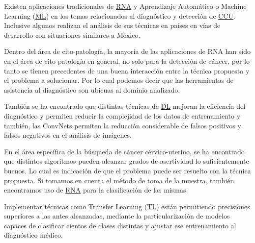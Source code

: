 
Existen aplicaciones tradicionales de \hyperlink{abbr}{RNA} y Aprendizaje
Automático o Machine Learning (\hyperlink{abbr}{ML}) en los temas relacionados al diagnóstico y detección de
\hyperlink{abbr}{CCU}. Inclusive algunos realizan el análisis de sus técnicas en
países en vías de desarrollo con situaciones similares a
México.~\cite{HussainWanandIshakWanandFadzilah1994}

Dentro del área de cito-patología, la mayoría de las aplicaciones de RNA han
sido en el área de cito-patología en general, no solo para la detección de
cáncer, por lo tanto se tienen precedentes de una buena interacción entre la
técnica propuesta y el problema a solucionar. Por lo cual podemos decir que las
herramientas de asistencia al diagnóstico son ubicuas al dominio
analizado.~\cite{Pouliakis2016}

También se ha encontrado que distintas técnicas de \hyperlink{abbr}{DL} mejoran
la eficiencia del diagnóstico y permiten reducir la complejidad de los datos de
entrenamiento y también, las ConvNets permiten la reducción considerable de
falsos positivos y falsos negativos en el análisis de
imágenes.~\cite{Khosravi2017}

En el área específica de la búsqueda de cáncer cérvico-uterino, se ha
encontrado que distintos algoritmos pueden alcanzar grados de asertividad lo
suficientemente buenos. Lo cual es indicación de que el problema puede ser
resuelto con la técnica propuesta. Si tomamos en cuenta el método de toma de la
muestra, también encontramos uso de \hyperlink{abbr}{RNA} para  la
clasificación de las mismas.~\cite{Ampazis2004}

Implementar técnicas como Transfer Learning
(\hyperlink{abbr}{TL}) están permitiendo
precisiones superiores a las antes alcanzadas, mediante la particularización de
modelos capaces de clasificar cientos de clases distintas y ajustar ese
entrenamiento al diagnóstico
médico.~\cite{Sarwar2013}\cite{Sarwar2015}\cite{Zhang2017}

